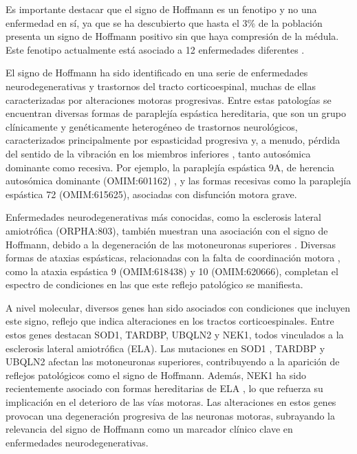 Es importante destacar que el signo de Hoffmann es un fenotipo y no una enfermedad en sí, ya que se ha descubierto que hasta el 3\% de la población presenta un signo de Hoffmann positivo sin que haya compresión de la médula. Este fenotipo actualmente está asociado a 12 enfermedades diferentes \cite{whitney}.

El signo de Hoffmann ha sido identificado en una serie de enfermedades neurodegenerativas y trastornos del tracto corticoespinal, muchas de ellas caracterizadas por alteraciones motoras progresivas. Entre estas patologías se encuentran diversas formas de paraplejía espástica hereditaria, que son un grupo clínicamente y genéticamente heterogéneo de trastornos neurológicos, caracterizados principalmente por espasticidad progresiva y, a menudo, pérdida del sentido de la vibración en los miembros inferiores \cite{Esteves2014}, tanto autosómica dominante como recesiva. Por ejemplo, la paraplejía espástica 9A, de herencia autosómica dominante (OMIM:601162) \cite{10.1093/brain/awv143}, y las formas recesivas como la paraplejía espástica 72 (OMIM:615625), asociadas con disfunción motora grave.

Enfermedades neurodegenerativas más conocidas, como la esclerosis lateral amiotrófica (ORPHA:803), también muestran una asociación con el signo de Hoffmann, debido a la degeneración de las motoneuronas superiores \cite{RIANCHO201927}. Diversas formas de ataxias espásticas, relacionadas con la falta de coordinación motora \cite{Pedroso2022}, como la ataxia espástica 9 (OMIM:618438) y 10 (OMIM:620666), completan el espectro de condiciones en las que este reflejo patológico se manifiesta.

A nivel molecular, diversos genes han sido asociados con condiciones que incluyen este signo, reflejo que indica alteraciones en los tractos corticoespinales. Entre estos genes destacan SOD1, TARDBP, UBQLN2 y NEK1, todos vinculados a la esclerosis lateral amiotrófica (ELA). Las mutaciones en SOD1 \cite{zhao2022g41d}, TARDBP \cite{sanchez2022atypical} y UBQLN2 \cite{teyssou:hal-03001781} afectan las motoneuronas superiores, contribuyendo a la aparición de reflejos patológicos como el signo de Hoffmann. Además, NEK1 ha sido recientemente asociado con formas hereditarias de ELA \cite{mann2023NEK1}, lo que refuerza su implicación en el deterioro de las vías motoras. Las alteraciones en estos genes provocan una degeneración progresiva de las neuronas motoras, subrayando la relevancia del signo de Hoffmann como un marcador clínico clave en enfermedades neurodegenerativas.

